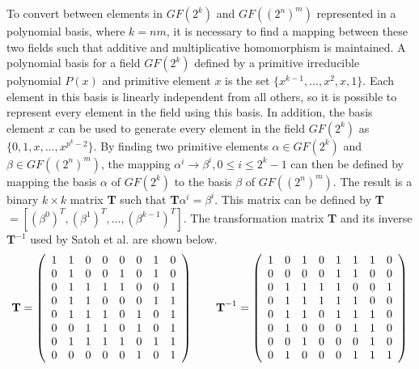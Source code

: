 To convert between elements in $GF(2^k)$ and $GF((2^n)^m)$ represented in 
a polynomial basis, where $k = nm$, it is necessary to find a mapping between 
these two fields such that additive and multiplicative homomorphism is maintained. 
A polynomial basis for a field $GF(2^k)$ defined by a primitive irreducible polynomial $P(x)$
and primitive element $x$ is the set $\{x^{k-1}, \dots,x^2,x,1\}$. Each element
in this basis is linearly independent from all others, so it is possible to represent every element
in the field using this basis. In addition, the basis element $x$ can 
be used to generate every element in the field $GF(2^k)$ as $\{0, 1, x,\dots, x^{p^{k} - 2}\}$.
By finding two primitive elements $\alpha \in GF(2^k)$ and $\beta \in GF((2^n)^m)$, 
the mapping $\alpha^i \to \beta^i, 0 \leq i \leq 2^k - 1$ can then be defined 
by mapping the basis $\alpha$ of $GF(2^k)$ to the basis $\beta$ of $GF((2^n)^m)$.
The result is a binary $k \times k$ matrix \textbf{T} such that \textbf{T}$\alpha^i = \beta^i$.
This matrix can be defined by \textbf{T}$ = [(\beta^0)^T, (\beta^1)^T,\dots,(\beta^{k-1})^T]$.
The transformation matrix \textbf{T} and its inverse \textbf{T}$^{-1}$ used by Satoh et al.
are shown below.
\begin{align*}
	\text{\textbf{T}} =  \left( \begin{array}{cccccccc}
1 & 1 & 0 & 0 & 0 & 0 & 1 & 0 \\
0 & 1 & 0 & 0 & 1 & 0 & 1 & 0 \\
0 & 1 & 1 & 1 & 1 & 0 & 0 & 1 \\
0 & 1 & 1 & 0 & 0 & 0 & 1 & 1 \\
0 & 1 & 1 & 1 & 0 & 1 & 0 & 1 \\
0 & 0 & 1 & 1 & 0 & 1 & 0 & 1 \\
0 & 1 & 1 & 1 & 1 & 0 & 1 & 1 \\
0 & 0 & 0 & 0 & 0 & 1 & 0 & 1 \end{array} \right) \hspace{2em} \text{\textbf{T}}^{-1} = 
\left( \begin{array}{cccccccc}
1 & 0 & 1 & 0 & 1 & 1 & 1 & 0 \\
0 & 0 & 0 & 0 & 1 & 1 & 0 & 0 \\
0 & 1 & 1 & 1 & 1 & 0 & 0 & 1 \\
0 & 1 & 1 & 1 & 1 & 1 & 0 & 0 \\
0 & 1 & 1 & 0 & 1 & 1 & 1 & 0 \\
0 & 1 & 0 & 0 & 0 & 1 & 1 & 0 \\
0 & 0 & 1 & 0 & 0 & 0 & 1 & 0 \\
0 & 1 & 0 & 0 & 0 & 1 & 1 & 1 \end{array} \right)
\end{align*}
